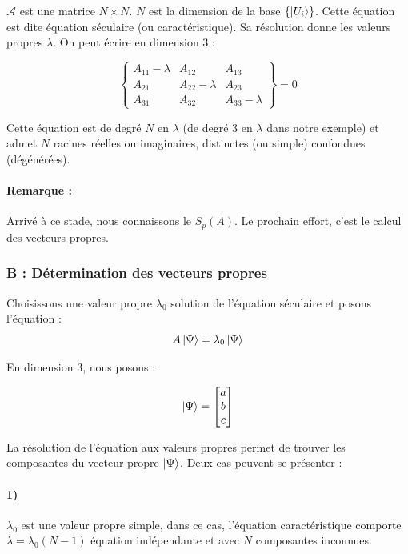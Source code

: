 \documentclass[12pt,a4paper,titlepage]{book}
\begin{document}
$\mathcal{A}$ est une matrice $N \times N$. $N$ est la dimension de la base $\left\lbrace \ket{U_i} \right\rbrace$. Cette équation est dite équation séculaire (ou caractéristique). Sa résolution donne les valeurs propres $\lambda$. On peut écrire en dimension 3 :\\
\begin{center}
\[
\left\lbrace
\begin{matrix}
A_{11} - \lambda & A_{12} & A_{13}\\
A_{21} & A_{22} - \lambda & A_{23}\\
A_{31} & A_{32} & A_{33} - \lambda
\end{matrix}
\right\rbrace = 0
\]
\end{center}
Cette équation est de degré $N$ en $\lambda$ (de degré 3 en $\lambda$ dans notre exemple) et admet $N$ racines réelles ou imaginaires, distinctes (ou simple) confondues (dégénérées).

\paragraph*{Remarque :}
Arrivé à ce stade, nous connaissons le $S_p (A)$. Le prochain effort, c'est le calcul des vecteurs propres.

\subsubsection{B : Détermination des vecteurs propres}

Choisissons une valeur propre $\lambda_0$ solution de l'équation séculaire et posons l'équation :
\begin{equation*}
A \ket{\Psi} = \lambda_0 \ket{\Psi}
\end{equation*}

En dimension 3, nous posons :
\begin{center}
\[
\ket{\Psi} =
\left[
\begin{matrix}
a\\
b\\
c
\end{matrix}
\right]
\]
\end{center}

La résolution de l'équation aux valeurs propres permet de trouver les composantes du vecteur propre $\ket{\Psi}$. Deux cas peuvent se présenter :
\paragraph*{1)}
$\lambda_0$ est une valeur propre simple, dans ce cas, l'équation caractéristique comporte $\lambda = \lambda_0 (N-1)$ équation indépendante et avec $N$ composantes inconnues.
\end{document}
